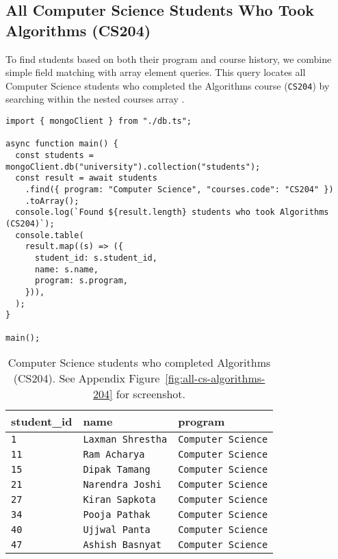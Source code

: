 \subsection{All Computer Science Students Who Took Algorithms (CS204)}
To find students based on both their program and course history, we combine simple field matching with array element queries. This query locates all Computer Science students who completed the Algorithms course (\texttt{CS204}) by searching within the nested courses array \parencite{mongodb_definitive_guide}.

\begin{verbatim}
import { mongoClient } from "./db.ts";

async function main() {
  const students = mongoClient.db("university").collection("students");
  const result = await students
    .find({ program: "Computer Science", "courses.code": "CS204" })
    .toArray();
  console.log(`Found ${result.length} students who took Algorithms (CS204)`);
  console.table(
    result.map((s) => ({
      student_id: s.student_id,
      name: s.name,
      program: s.program,
    })),
  );
}

main();
\end{verbatim}

\begin{table}[H]
  \centering
  \begin{tabular}{|l|l|l|}
    \hline
    \textbf{student\_id} & \textbf{name} & \textbf{program} \\
    \hline
    \texttt{1} & \texttt{Laxman Shrestha} & \texttt{Computer Science} \\
    \texttt{11} & \texttt{Ram Acharya} & \texttt{Computer Science} \\
    \texttt{15} & \texttt{Dipak Tamang} & \texttt{Computer Science} \\
    \texttt{21} & \texttt{Narendra Joshi} & \texttt{Computer Science} \\
    \texttt{27} & \texttt{Kiran Sapkota} & \texttt{Computer Science} \\
    \texttt{34} & \texttt{Pooja Pathak} & \texttt{Computer Science} \\
    \texttt{40} & \texttt{Ujjwal Panta} & \texttt{Computer Science} \\
    \texttt{47} & \texttt{Ashish Basnyat} & \texttt{Computer Science} \\
    \hline
  \end{tabular}
  \caption{Computer Science students who completed Algorithms (CS204). See Appendix Figure~\ref{fig:all-cs-algorithms-204} for screenshot.}
\end{table}

